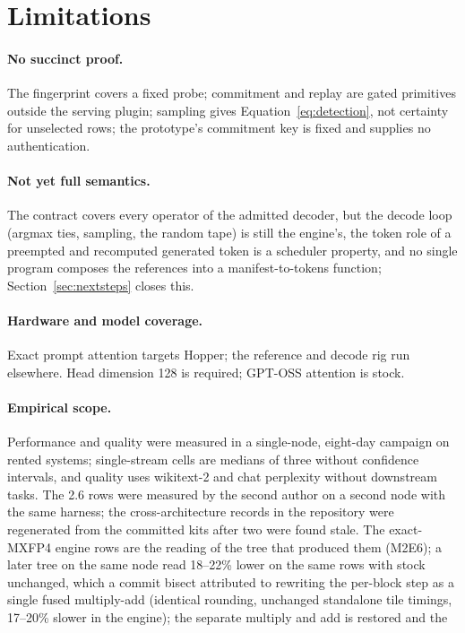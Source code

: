 \documentclass{article}
\begin{document}
\section{Limitations}
\label{sec:limitations}

\paragraph{No succinct proof.}  The fingerprint covers a fixed probe; commitment and replay
are gated primitives outside the serving plugin; sampling gives Equation~\eqref{eq:detection},
not certainty for unselected rows; the prototype's commitment key is fixed and supplies no
authentication.  \paragraph{Not yet full semantics.}  The contract covers every operator of
the admitted decoder, but the decode loop (argmax ties, sampling, the random tape) is still
the engine's, the token role of a preempted and recomputed generated token is a scheduler
property, and no single program composes the references into a manifest-to-tokens function;
Section~\ref{sec:nextsteps} closes this.  \paragraph{Hardware and model coverage.}  Exact
prompt attention targets Hopper; the reference and decode rig run elsewhere.  Head dimension
128 is required; GPT-OSS attention is stock.  \paragraph{Empirical scope.}  Performance and
quality were measured in a single-node, eight-day campaign on rented systems; single-stream
cells are medians of three without confidence intervals, and quality uses wikitext-2 and chat
perplexity without downstream tasks.  The 2.6 rows were measured by the second author on a second node with
the same harness; the cross-architecture records in the repository were regenerated from the
committed kits after two were found stale.  The exact-MXFP4 engine rows are the reading of
the tree that produced them (M2E6); a later tree on the same node read 18--22\% lower on
the same rows with stock unchanged, which a commit bisect attributed to rewriting the
per-block step as a single fused multiply-add (identical rounding, unchanged standalone tile
timings, 17--20\% slower in the engine); the separate multiply and add is restored and the
\end{document}
